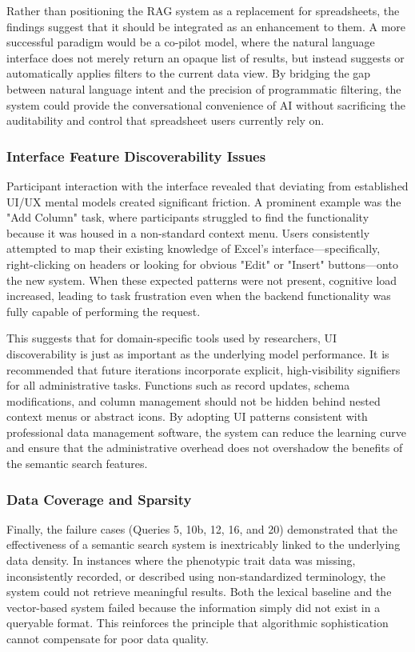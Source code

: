 \documentclass[journal]{./IEEE/IEEEtran}
\begin{document}
Rather than positioning the RAG system as a replacement for spreadsheets, the findings suggest that it should be integrated as an enhancement to them. A more successful paradigm would be a co-pilot model, where the natural language interface does not merely return an opaque list of results, but instead suggests or automatically applies filters to the current data view. By bridging the gap between natural language intent and the precision of programmatic filtering, the system could provide the conversational convenience of AI without sacrificing the auditability and control that spreadsheet users currently rely on.

\subsubsection{Interface Feature Discoverability Issues}
Participant interaction with the interface revealed that deviating from established UI/UX mental models created significant friction. A prominent example was the "Add Column" task, where participants struggled to find the functionality because it was housed in a non-standard context menu. Users consistently attempted to map their existing knowledge of Excel's interface—specifically, right-clicking on headers or looking for obvious "Edit" or "Insert" buttons—onto the new system. When these expected patterns were not present, cognitive load increased, leading to task frustration even when the backend functionality was fully capable of performing the request.

This suggests that for domain-specific tools used by researchers, UI discoverability is just as important as the underlying model performance. It is recommended that future iterations incorporate explicit, high-visibility signifiers for all administrative tasks. Functions such as record updates, schema modifications, and column management should not be hidden behind nested context menus or abstract icons. By adopting UI patterns consistent with professional data management software, the system can reduce the learning curve and ensure that the administrative overhead does not overshadow the benefits of the semantic search features.

\subsubsection{Data Coverage and Sparsity}
Finally, the failure cases (Queries 5, 10b, 12, 16, and 20) demonstrated that the effectiveness of a semantic search system is inextricably linked to the underlying data density. In instances where the phenotypic trait data was missing, inconsistently recorded, or described using non-standardized terminology, the system could not retrieve meaningful results. Both the lexical baseline and the vector-based system failed because the information simply did not exist in a queryable format. This reinforces the principle that algorithmic sophistication cannot compensate for poor data quality.
\end{document}
